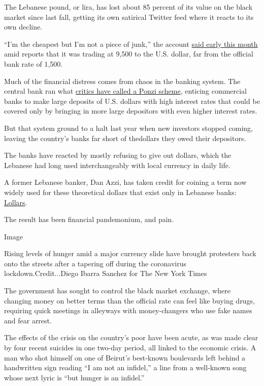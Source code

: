 The Lebanese pound, or lira, has lost about 85 percent of its value on
the black market since last fall, getting its own satirical Twitter feed
where it reacts to its own decline.

``I'm the cheapest but I'm not a piece of junk,'' the account
\href{https://twitter.com/LebaneseLira/status/1278727340768534529}{said
early this month} amid reports that it was trading at 9,500 to the U.S.
dollar, far from the official bank rate of 1,500.

Much of the financial distress comes from chaos in the banking system.
The central bank ran what
\href{https://www.nytimes.com/2019/12/02/opinion/lebanon-protests.html}{critics
have called a Ponzi scheme}, enticing commercial banks to make large
deposits of U.S. dollars with high interest rates that could be covered
only by bringing in more large depositors with even higher interest
rates.

But that system ground to a halt last year when new investors stopped
coming, leaving the country's banks far short of thedollars they owed
their depositors.

The banks have reacted by mostly refusing to give out dollars, which the
Lebanese had long used interchangeably with local currency in daily
life.

A former Lebanese banker, Dan Azzi, has taken credit for coining a term
now widely used for these theoretical dollars that exist only in
Lebanese banks: \href{https://www.lollar.club/}{Lollars}.

The result has been financial pandemonium, and pain.

Image

Rising levels of hunger amid a major currency slide have brought
protesters back onto the streets after a tapering off during the
coronavirus lockdown.Credit...Diego Ibarra Sanchez for The New York
Times

The government has sought to control the black market exchange, where
changing money on better terms than the official rate can feel like
buying drugs, requiring quick meetings in alleyways with money-changers
who use fake names and fear arrest.

The effects of the crisis on the country's poor have been acute, as was
made clear by four recent suicides in one two-day period, all linked to
the economic crisis. A man who shot himself on one of Beirut's
best-known boulevards left behind a handwritten sign reading ``I am not
an infidel,'' a line from a well-known song whose next lyric is ``but
hunger is an infidel.''


